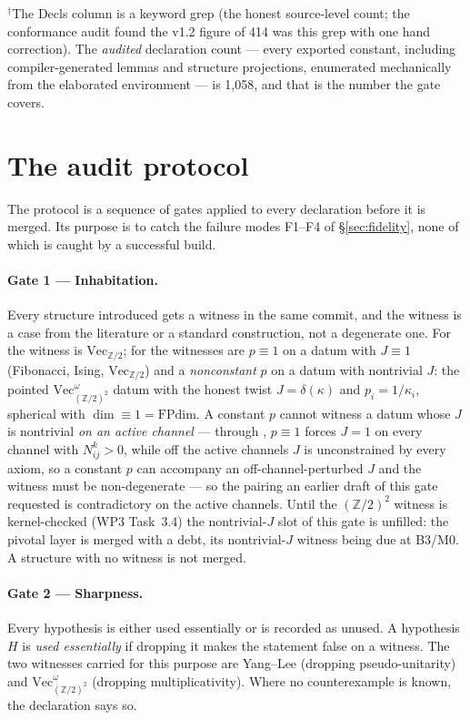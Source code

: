 \documentclass[11pt,a4paper]{article}
\theoremstyle{remark}
\newcommand{\code}[1]{\texttt{\detokenize{#1}}}
\newcommand{\FPdim}{\mathrm{FPdim}}
\newcommand{\Vect}{\mathrm{Vec}}
\newcommand{\Z}{\mathbb{Z}}
\begin{document}
\noindent$^{\dagger}$The Decls column is a keyword grep (the honest source-level count; the
conformance audit found the v1.2 figure of 414 was this grep with one hand correction).
The \emph{audited} declaration count --- every exported constant, including compiler-generated
lemmas and structure projections, enumerated mechanically from the elaborated environment ---
is 1{,}058, and that is the number the gate covers.

\section{The audit protocol}\label{app:audit}

The protocol is a sequence of gates applied to every declaration before it is merged. Its purpose
is to catch the failure modes F1--F4 of \S\ref{sec:fidelity}, none of which is caught by a
successful build.

\paragraph{Gate 1 --- Inhabitation.} Every structure introduced gets a witness in the same
commit, and the witness is a case from the literature or a standard construction, not a
degenerate one. For \code{FusionSystem} the witness is $\Vect_{\Z/2}$; for
\code{PivotalStructure} the witnesses are $p \equiv 1$ on a datum with $J \equiv 1$ (Fibonacci,
Ising, $\Vect_{\Z/2}$) and a \emph{nonconstant} $p$ on a datum with nontrivial $J$: the pointed
$\Vect^{\omega}_{(\Z/2)^{2}}$ datum with the honest twist $J = \delta(\kappa)$ and
$p_i = 1/\kappa_i$, spherical with $\dim \equiv 1 = \FPdim$. A constant $p$ cannot witness a
datum whose $J$ is nontrivial \emph{on an active channel} --- through \code{p_mon},
$p \equiv 1$ forces $J = 1$ on every channel with $N_{ij}^{k} > 0$, while off the active
channels $J$ is unconstrained by every axiom, so a constant $p$ can accompany an
off-channel-perturbed $J$ and the witness must be non-degenerate --- so the pairing an
earlier draft of this gate requested is contradictory on the active channels. Until
the $(\Z/2)^{2}$ witness is kernel-checked (WP3 Task~3.4) the nontrivial-$J$ slot of this gate
is unfilled: the pivotal layer is merged with a debt, its nontrivial-$J$ witness being due at
B3/M0. A structure with no witness is not merged.

\paragraph{Gate 2 --- Sharpness.} Every hypothesis is either used essentially or is recorded as
unused. A hypothesis $H$ is \emph{used essentially} if dropping it makes the statement false on a
witness. The two witnesses carried for this purpose are Yang--Lee (dropping pseudo-unitarity) and
$\Vect^{\omega}_{(\Z/2)^2}$ (dropping multiplicativity). Where no counterexample is known, the
declaration says so.
\end{document}
